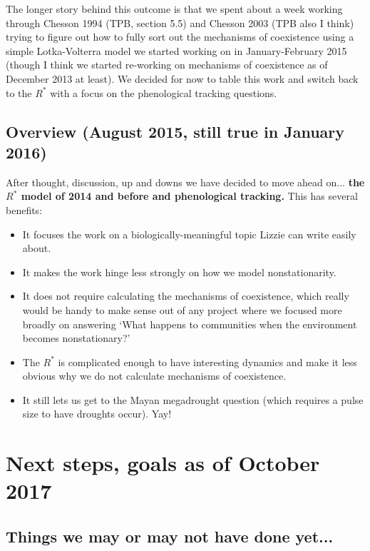 \documentclass[11pt,a4paper,oneside]{article}
\newenvironment{smitemize}{
\begin{itemize}
  \setlength{\itemsep}{1pt}
  \setlength{\parskip}{0pt}
  \setlength{\parsep}{0pt}}
{\end{itemize}
}
\begin{document}
\noindent The longer story behind this outcome is that we spent about a week working through Chesson 1994 (TPB, section 5.5) and Chesson 2003 (TPB also I think) trying to figure out how to fully sort out the mechanisms of coexistence using a simple Lotka-Volterra model we started working on in January-February 2015 (though I think we started re-working on mechanisms of coexistence as of December 2013 at least). We decided for now to table this work and switch back to the $R^*$ with a focus on the phenological tracking questions. 

\subsection{Overview (August 2015, still true in January 2016)}
After thought, discussion, up and downs we have decided to move ahead
on... {\bf the $R^*$ model of 2014 and before and phenological
  tracking.} This has several benefits:
\begin{smitemize}
\item It focuses the work on a biologically-meaningful topic Lizzie
  can write easily about.
\item It makes the work hinge less strongly on how we model
  nonstationarity.
\item It does not require calculating the mechanisms of coexistence,
  which really would be handy to make sense out of any project where
  we focused more broadly on answering `What happens to communities when the environment
  becomes nonstationary?'
\item The $R^*$ is complicated enough to have interesting dynamics and
  make it less obvious why we do not calculate mechanisms of
  coexistence.
\item It still lets us get to the Mayan megadrought question (which
  requires a pulse size to have droughts occur). Yay!
\end{smitemize}

\newpage
\section{Next steps, goals as of October 2017}

\subsection{Things we may or may not have done yet...}
\end{document}
